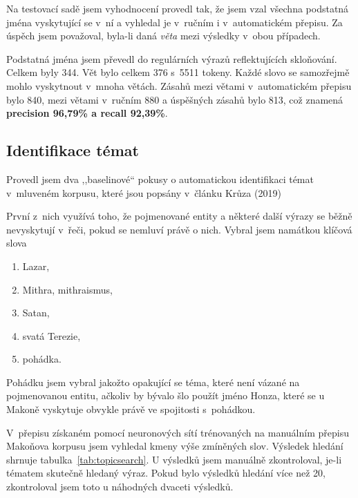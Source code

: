 Na testovací sadě jsem vyhodnocení provedl tak, že jsem vzal všechna podstatná
jména vyskytující se v~ní a vyhledal je v~ručním i v~automatickém přepisu.
Za úspěch jsem považoval, byla-li daná {\em věta} mezi výsledky v~obou
případech.

Podstatná jména jsem převedl do regulárních výrazů reflektujících skloňování.
Celkem byly 344. Vět bylo celkem 376 s~5511 tokeny. Každé slovo se samozřejmě
mohlo vyskytnout v~mnoha větách. Zásahů mezi větami v~automatickém přepisu bylo
840, mezi větami v~ručním 880 a úspěšných zásahů bylo 813, což znamená \textbf{precision
96,79\% a recall 92,39\%}.

\subsection{Identifikace témat}
\label{ssec:data:topicsearch}

Provedl jsem dva ,,baselinové`` pokusy o automatickou identifikaci témat
v~mluveném korpusu, které jsou popsány v~článku Krůza (2019)\cite{kruza2019spoken}

První z~nich využívá toho, že pojmenované entity a některé další výrazy se běžně
nevyskytují v~řeči, pokud se nemluví právě o nich. Vybral jsem namátkou klíčová
slova
\begin{enumerate}
\item{Lazar,}
\item{Mithra, mithraismus,}
\item{Satan,}
\item{svatá Terezie,}
\item{pohádka.}
\end{enumerate}

Pohádku jsem vybral jakožto opakující se téma, které není vázané na pojmenovanou
entitu, ačkoliv by bývalo šlo použít jméno Honza, které se u Makoně vyskytuje
obvykle právě ve spojitosti s~pohádkou.

V~přepisu %
získaném pomocí neuronových sítí trénovaných na manuálním přepisu Makoňova korpusu jsem vyhledal kmeny
výše zmíněných slov. Výsledek hledání shrnuje tabulka~\ref{tab:topicsearch}.
U výsledků jsem manuálně zkontroloval, je-li tématem skutečně hledaný výraz.
Pokud bylo výsledků hledání více než 20, zkontroloval jsem toto u náhodných
dvaceti výsledků.

